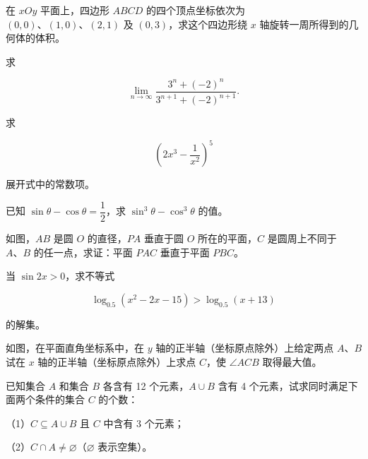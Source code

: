 \begin{question}
在 $xOy$ 平面上，四边形 $ABCD$ 的四个顶点坐标依次为 $(0,0)\text{、}(1,0)\text{、}(2,1)$ 及 $(0,3)$，求这个四边形绕 $x$ 轴旋转一周所得到的几何体的体积。

\end{question}
\begin{question}
求

\nopagebreak[4]
\[
\lim_{n\to\infty}\frac{3^n+(-2)^n}{3^{n+1}+(-2)^{n+1}}.
\]

\end{question}
\begin{question}
求

\nopagebreak[4]
\[
\left(2x^3-\frac1{x^2}\right)^5
\]

展开式中的常数项。

\end{question}
\begin{question}
已知 $\sin\theta-\cos\theta=\dfrac12$，求 $\sin^3\theta-\cos^3\theta$ 的值。

\Needspace{0.4\textheight}
\end{question}
\begin{question}
如图，$AB$ 是圆 $O$ 的直径，$PA$ 垂直于圆 $O$ 所在的平面，$C$ 是圆周上不同于 $A\text{、}B$ 的任一点，求证：平面 $PAC$ 垂直于平面 $PBC$。
\nopagebreak[4]
\begin{center}\end{center}
\nopagebreak[4]
\end{question}
\begin{question}
当 $\sin2x>0$，求不等式

\nopagebreak[4]
\[
\log_{0.5}(x^2-2x-15)>\log_{0.5}(x+13)
\]

的解集。

\Needspace{0.4\textheight}
\end{question}
\begin{question}
如图，在平面直角坐标系中，在 $y$ 轴的正半轴（坐标原点除外）上给定两点 $A\text{、}B$ 试在 $x$ 轴的正半轴（坐标原点除外）上求点 $C$，使 $\angle ACB$ 取得最大值。
\nopagebreak[4]
\begin{center}\end{center}
\nopagebreak[4]
\end{question}
\begin{question}
已知集合 $A$ 和集合 $B$ 各含有 12 个元素，$A\cup B$ 含有 4 个元素，试求同时满足下面两个条件的集合 $C$ 的个数：

（1）$C\subseteq A\cup B$ 且 $C$ 中含有 3 个元素；

（2）$C\cap A\ne\varnothing$（$\varnothing$ 表示空集）。

\end{question}

